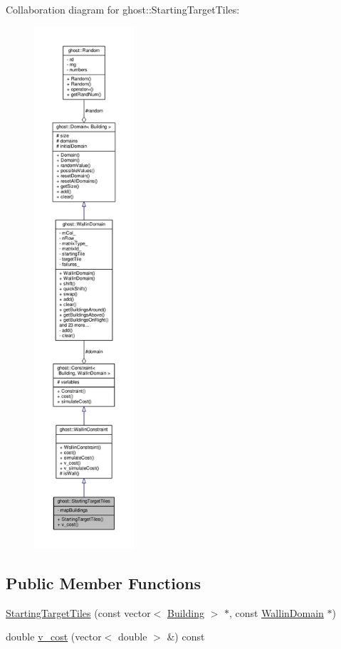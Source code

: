 Collaboration diagram for ghost\-:\-:Starting\-Target\-Tiles\-:\nopagebreak
\begin{figure}[H]
\begin{center}
\leavevmode
\includegraphics[height=550pt]{classghost_1_1StartingTargetTiles__coll__graph}
\end{center}
\end{figure}
\subsection*{Public Member Functions}
\begin{DoxyCompactItemize}
\item 
\hyperlink{classghost_1_1StartingTargetTiles_a6c2b6cf28fb668cfe7909396679d2587}{Starting\-Target\-Tiles} (const vector$<$ \hyperlink{classghost_1_1Building}{Building} $>$ $\ast$, const \hyperlink{classghost_1_1WallinDomain}{Wallin\-Domain} $\ast$)
\item 
double \hyperlink{classghost_1_1StartingTargetTiles_aa9474c7fb81691a2059d2e5614702544}{v\-\_\-cost} (vector$<$ double $>$ \&) const 
\end{DoxyCompactItemize}
